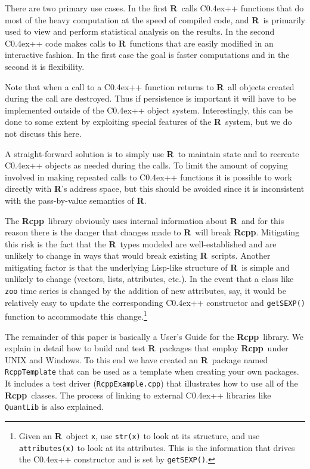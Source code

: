 \documentclass{article}
\def\C++{C{\raise 0.4ex\hbox{\tiny ++}}}
\newcommand{\R}{{\bf R}}
\newcommand{\Rcpp}{{\bf Rcpp}}
\begin{document}
There are two primary use cases. In the first \R\ calls \C++ functions
that do most of the heavy computation at the speed of compiled code,
and \R\ is primarily used to view and perform statistical analysis on
the results. In the second \C++ code makes calls to \R\ functions that
are easily modified in an interactive fashion. In the first case the
goal is faster computations and in the second it is flexibility.

Note that when a call to a \C++ function returns to \R\ all
objects created during the call are destroyed. Thus if persistence is
important it will have to be implemented outside of the \C++ object
system. Interestingly, this can be done to some extent by exploiting
special features of the \R\ system, but we do not discuss this here.

A straight-forward solution is to simply use \R\ to maintain state and to
recreate \C++ objects as needed during the calls. To limit the
amount of copying involved in making repeated calls to \C++ functions
it is possible to work directly with \R's address space,
but this should be avoided since it is inconsistent with the
pass-by-value semantics of \R.

The \Rcpp\ library obviously uses internal information about \R\ and
for this reason there is the danger that changes made to \R\ will
break \Rcpp. Mitigating this risk is the fact that the \R\ types
modeled are well-established and are unlikely to change in ways that
would break existing \R\ scripts. Another mitigating factor
is that the underlying Lisp-like structure of \R\ is simple and unlikely
to change (vectors, lists, attributes, etc.). In the event that a
class like {\tt zoo} time series is changed by the addition of
new attributes, say, it would be relatively easy to update the corresponding
\C++ constructor and {\tt getSEXP()} function to accommodate this
change.\footnote{Given an \R\ object {\tt x}, use {\tt str(x)} to look at
its structure, and use {\tt attributes(x)} to look at its attributes. This
is the information that drives the \C++ constructor and is set by
{\tt getSEXP()}.}

The remainder of this paper is basically a User's Guide for the
\Rcpp\ library. We explain in detail how to build and test \R\ packages
that employ \Rcpp\ under UNIX and Windows. To this end we have
created an \R\ package named {\tt RcppTemplate} that can be used
as a template when creating your own packages. It includes a test
driver ({\tt RcppExample.cpp}) that illustrates how to use all of
the \Rcpp\ classes. 
The process of linking to
external \C++ libraries like {\tt QuantLib} is also explained.
\end{document}

